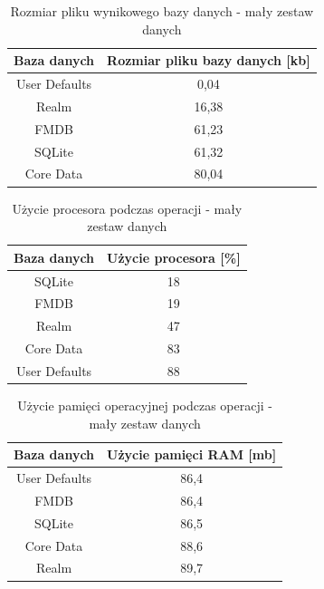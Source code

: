 \begin{table}[h]
\centering
\caption{Rozmiar pliku wynikowego bazy danych - mały zestaw danych}
\label{tab: small-save-file-size-table}
\begin{tabular}{|c|c|}
\hline
Baza danych   & Rozmiar pliku bazy danych [kb] \\ \hline
User Defaults & 0,04                            \\ \hline
Realm         & 16,38                           \\ \hline
FMDB          & 61,23                           \\ \hline
SQLite        & 61,32                           \\ \hline
Core Data     & 80,04                           \\ \hline
\end{tabular}
\end{table}

\newpage

\begin{table}[h]
\centering
\caption{Użycie procesora podczas operacji - mały zestaw danych}
\label{tab: small-save-cpu-table}
\begin{tabular}{|c|c|}
\hline
Baza danych   & Użycie procesora [\%] \\ \hline
SQLite        & 18                   \\ \hline
FMDB          & 19                   \\ \hline
Realm         & 47                   \\ \hline
Core Data     & 83                   \\ \hline
User Defaults & 88                   \\ \hline
\end{tabular}
\end{table}

\begin{table}[h]
\centering
\caption{Użycie pamięci operacyjnej podczas operacji - mały zestaw danych}
\label{tab: small-save-ram-table}
\begin{tabular}{|c|c|}
\hline
Baza danych   & Użycie pamięci RAM [mb] \\ \hline
User Defaults & 86,4                    \\ \hline
FMDB          & 86,4                    \\ \hline
SQLite        & 86,5                    \\ \hline
Core Data     & 88,6                    \\ \hline
Realm         & 89,7                    \\ \hline
\end{tabular}
\end{table}

